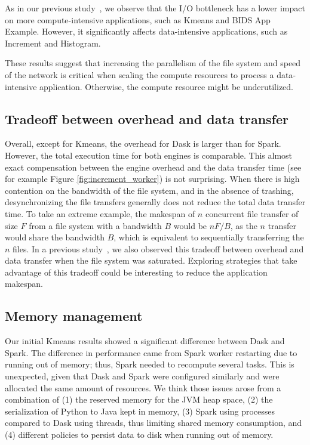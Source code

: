 \documentclass[AMA,STIX1COL]{WileyNJD-v2}
\newcommand{\HL}[1]{#1}
\begin{document}
As in our previous study~{\cite{8943502}}, we observe that the I/O bottleneck has a lower impact on more compute-intensive applications, such as Kmeans and BIDS App Example.
However, it significantly affects data-intensive applications, such as Increment and Histogram.
							
							
These results suggest that increasing the parallelism of the file system and speed of the network is critical when scaling the compute resources to process a data-intensive application.
Otherwise, the compute resource might be underutilized.
							
\subsection{Tradeoff between overhead and data transfer}
\label{subsec:overhead-tradeoff}
Overall, except for Kmeans, the overhead for Dask is larger than for Spark.
However, the total execution time for both engines is comparable.
This almost exact compensation between the engine overhead and the data transfer time (see for example Figure \ref{fig:increment_worker}) is not surprising.
When there is high contention on the bandwidth of the file system, and in the absence of trashing, desynchronizing the file transfers generally does not reduce the total data transfer time.
To take an extreme example, the makespan of $n$ concurrent file transfer of size $F$ from a file system with a bandwidth $B$ would be $nF/B$,
as the $n$ transfer would share the bandwidth $B$, which is equivalent to sequentially transferring the $n$ files.
In a previous study~\cite{8943502}, we also observed this tradeoff between overhead and data transfer when the file system was saturated.
Exploring strategies that take advantage of this tradeoff could be interesting to reduce the application makespan.
																	
\subsection{Memory management}
\HL{Our initial Kmeans results showed a significant difference between Dask and Spark.}
The difference in performance \HL{came} from Spark worker restarting due to running out of memory; thus, Spark \HL{needed} to recompute several tasks.
This is unexpected, given that Dask and Spark \HL{were} configured similarly and \HL{were} allocated the same amount of resources.
We think those issues \HL{arose} from a combination of
(1) the reserved memory for the JVM heap space,
(2) the serialization of Python to Java kept in memory,
(3) Spark using processes compared to Dask using threads, thus limiting shared memory consumption,
and (4) different policies to persist data to disk when running out of memory.
							
\end{document}
